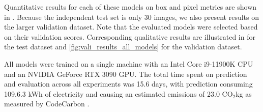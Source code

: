 \documentclass[10pt,twocolumn,letterpaper]{article}
\newcommand{\cotwo}{\ensuremath{\mathrm{CO_2}}}
\begin{document}
Quantitative results for each of these models on box and pixel metrics are shown in
  .
Because the independent test set is only 30 images, we also present results on the larger validation
  dataset.
Note that the evaluated models were selected based on their validation scores.
Corresponding qualitative results are illustrated in  for the test dataset
  and \cref{fig:vali_results_all_models} for the validation dataset.



All models were trained on a single machine with an Intel Core i9-11900K CPU and an NVIDIA GeForce RTX 3090
  GPU.
The total time spent on prediction and evaluation across all experiments was 15.6 days, with prediction
  consuming 109.6.3 kWh of electricity and causing an estimated emissions of 23.0 \cotwo kg as measured by
  CodeCarbon \cite{lacoste2019codecarbon}.
\end{document}
